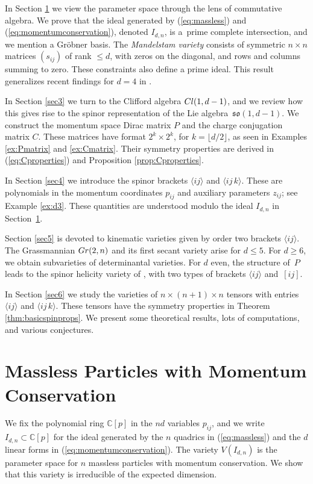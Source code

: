\documentclass[english]{ourlematema}
\numberwithin{theorem}{section}
\theoremstyle{definition}
\newcommand{\CC}{\mathbb{C}}
\begin{document}
In Section \ref{sec2} we view the parameter space
through the lens of commutative algebra. We prove
that the ideal generated by (\ref{eq:massless}) and
(\ref{eq:momentumconservation}), denoted $I_{d,n}$, is a~prime  complete intersection, and we  
mention a Gr\"obner basis. The {\em Mandelstam variety}
consists of symmetric $n \times n$ matrices $(s_{ij})$
of rank $\leq d$, with zeros on the diagonal, and 
rows and columns summing to zero.
These constraints also define a prime ideal.
This result generalizes recent findings
for $d=4$ in \cite[Section~4]{EPS}.

In Section \ref{sec3} we turn to the
Clifford algebra ${\rm Cl}(1,d-1)$, and we review how
this gives rise to the spinor
representation of the Lie algebra $\,\mathfrak{so}(1,d-1)$.
We construct the momentum space Dirac matrix $P$
and the charge conjugation matrix $C$.
These matrices have format $2^k \times 2^k$,
for $k = \lfloor d/2 \rfloor$, as seen in Examples 
\ref{ex:Pmatrix} and \ref{ex:Cmatrix}.
Their symmetry properties are derived in
(\ref{eq:Cproperties}) and
Proposition \ref{prop:Cproperties}.

In Section \ref{sec4} we introduce the
spinor brackets $\langle i j \rangle$
and $\langle i j \,k \rangle$. These
are polynomials in the momentum coordinates
$p_{ij}$ and auxiliary parameters $z_{ij}$;
see Example \ref{ex:d3}. These quantities are
understood modulo the ideal $I_{d,n}$ in Section~\ref{sec2}.

Section \ref{sec5} is devoted to
kinematic varieties given by order two brackets $\langle i j \rangle$.
The Grassmannian ${\rm Gr}(2,n)$ and its 
first secant variety arise for $d \leq 5$. For $d \geq 6$, we obtain subvarieties of
determinantal varieties. For $d$ even, the structure of~$P$
leads to the spinor helicity variety of \cite{EPS},
with two types of brackets
$\langle i j \rangle$ and~$[ i j ]$.

In Section \ref{sec6} we study the varieties  of
$n \times (n + 1) \times n$ tensors with entries $\langle i j \rangle$
and $\langle i j \,k \rangle$. These tensors have the symmetry properties in
Theorem \ref{thm:basicspinprops}.
We present some theoretical results, lots of computations, and
various conjectures.

\section{Massless Particles with Momentum Conservation}
\label{sec2}

We fix the polynomial ring $ \CC[p]$ in the
$nd$ variables $p_{ij}$, and we write
$I_{d,n} \subset \CC[p]$ for the ideal generated by 
the $n$ quadrics in (\ref{eq:massless}) and the $d$ linear forms in
(\ref{eq:momentumconservation}).
The variety $V(I_{d,n})$ is the parameter space
for $n$ massless particles with momentum conservation.
We show that this variety is irreducible of the expected dimension.
\end{document}
